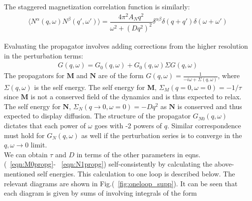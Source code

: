 \documentclass[prl,aps,twocolumn,nosuperscriptaddress,bibnotes,notitlepage,nofootinbib]{revtex4-2}
\newcommand{\magg}{\mathbf{M}}
\newcommand{\stagg}{\mathbf{N}}
\begin{document}
The staggered magnetization correlation function is similarly:
\begin{align}
    \label{eqn:stagg_correlation_ft}
    \langle N^{\alpha} (q, \omega) N^{\beta} (q', \omega') \rangle =  \dfrac{4 \pi^2 A_N q^2}{\omega^2 + (Dq^2)^2} \delta^{\alpha \beta} \delta(q+q')  \delta (\omega + \omega')
\end{align}

Evaluating the propagator involves adding corrections from the higher resolution in the perturbation terms:
\begin{align*}
    G(q,\omega) = G_0 (q, \omega) + G_0 (q, \omega) \Sigma G (q, \omega)
\end{align*}
The propagators for $\magg$ and $\stagg$ are of the form $ \displaystyle G (q,\omega)= \frac{1}{-i\omega + \Sigma(q,\omega)}$, where $\Sigma(q,\omega)$ is the self energy.  The self energy for $\magg$, $\Sigma_M(q=0,\omega=0) = -1/\tau$ since $\magg$ is not a conserved field of the dynamics and is thus expected to relax. The self energy for $\stagg$, $\Sigma_N(q \rightarrow 0,\omega=0) = -Dq^2$ as $\stagg$ is conserved and thus expected to display diffusion. The structure of the propagator $G_{N0}(q, \omega) $ dictates that each power of $\omega$ goes with -2 powers of $q$. Similar correspondence must hold for $G_N(q, \omega) $ as well if the perturbation series is to converge in the $q, \omega \rightarrow 0$ limit.\\

We can obtain $\tau$ and $D$ in terms of the other parameters in eqns.(~\ref{eqn:M0propg}- ~\ref{eqn:N1propg}) self-consistently by calculating the above-mentioned self energies. This calculation to one loop is described below. The relevant diagrams are shown in Fig.(~\ref{fig:oneloop_supp}).  It can be seen that each diagram is given by sums of involving integrals of the form
\end{document}
